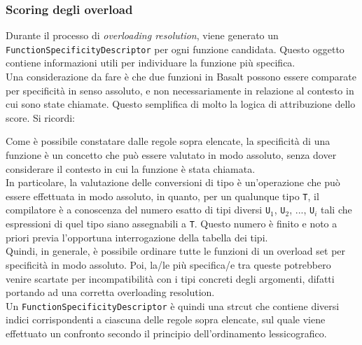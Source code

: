 \subsubsection{Scoring degli overload}
Durante il processo di \textit{overloading resolution}, viene generato un \texttt{FunctionSpecificityDescriptor}
per ogni funzione candidata. Questo oggetto contiene informazioni utili per individuare la funzione più specifica. \\

Una considerazione da fare è che due funzioni in Basalt possono essere comparate per specificità in senso assoluto, 
e non necessariamente in relazione al contesto in cui sono state chiamate. Questo semplifica di molto la logica di 
attribuzione dello score. Si ricordi:



Come è possibile constatare dalle regole sopra elencate, la specificità di una funzione è un concetto che può essere
valutato in modo assoluto, senza dover considerare il contesto in cui la funzione è stata chiamata. \\

In particolare, la valutazione delle conversioni di tipo è un'operazione che può essere effettuata in modo assoluto, in quanto,
per un qualunque tipo \texttt{T}, il compilatore è a conoscenza del numero esatto di tipi diversi \texttt{U$_1$}, \texttt{U$_2$}, ..., \texttt{U$_i$}
tali che espressioni di quel tipo siano assegnabili a \texttt{T}. Questo numero è finito e noto a priori previa l'opportuna 
interrogazione della tabella dei tipi. \\

Quindi, in generale, è possibile ordinare tutte le funzioni di un overload set per specificità in modo assoluto. Poi, la/le più specifica/e tra 
queste potrebbero venire scartate per incompatibilità con i tipi concreti degli argomenti, difatti portando ad una corretta overloading resolution. \\

Un \texttt{FunctionSpecificityDescriptor} è quindi una strcut che contiene diversi indici corrispondenti a ciascuna delle regole sopra elencate, 
sul quale viene effettuato un confronto secondo il principio dell'ordinamento lessicografico.